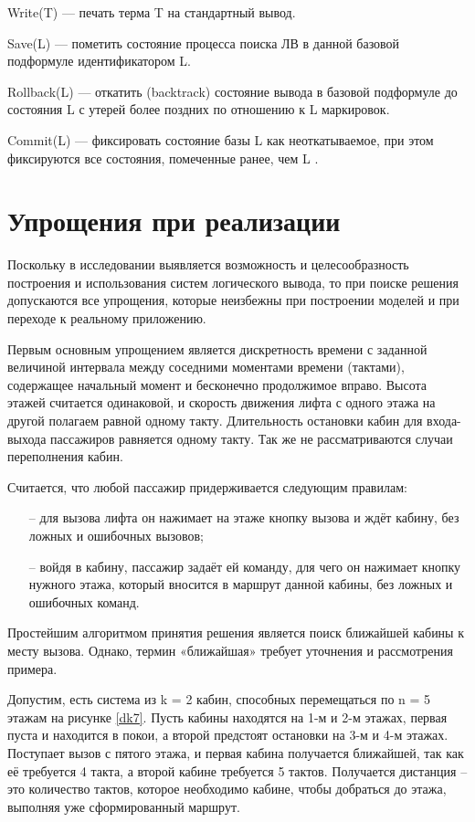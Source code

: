 Write(T) — печать терма T на стандартный вывод.

Save(L) — пометить состояние процесса поиска ЛВ в данной базовой подформуле идентификатором L.

Rollback(L) — откатить (backtrack) состояние вывода в базовой подформуле до состояния L с утерей более поздних по отношению к L маркировок.

Commit(L) — фиксировать состояние базы L как неоткатываемое, при этом фиксируются все состояния, помеченные ранее, чем L .
 
    
\section{Упрощения при реализации}
Поскольку в исследовании выявляется возможность и целесообразность построения и использования систем логического вывода, то при поиске решения допускаются все упрощения, которые неизбежны при построении моделей и при переходе к реальному приложению.

	Первым основным упрощением является дискретность времени с заданной величиной интервала между
		соседними моментами времени (тактами), содержащее начальный момент и бесконечно продолжимое вправо.
		Высота этажей считается одинаковой, и скорость движения лифта с одного этажа на другой полагаем
		равной одному такту. Длительность остановки кабин для входа-выхода пассажиров равняется одному такту.
		Так же не рассматриваются случаи переполнения кабин.

	Считается, что любой пассажир придерживается следующим правилам:
    
    \begin{itemize}
				\item[--] для вызова лифта он нажимает на этаже кнопку вызова и ждёт кабину, без ложных и ошибочных вызовов;
				\item[--] войдя в кабину, пассажир задаёт ей команду, для чего он нажимает кнопку нужного этажа, который вносится в маршрут данной кабины, без ложных и ошибочных команд.
    \end{itemize}

	Простейшим алгоритмом принятия решения является поиск ближайшей кабины к месту вызова.
		Однако, термин «ближайшая» требует уточнения и рассмотрения примера. 

	Допустим, есть система из k = 2 кабин, способных перемещаться по n = 5 этажам на рисунке \ref{dk7}.
		Пусть кабины находятся на 1-м и 2-м этажах, первая пуста и находится в покои,
		а второй предстоят остановки на 3-м и 4-м этажах. Поступает вызов с пятого этажа,
		и первая кабина получается ближайшей, так как её требуется 4 такта,
		а второй кабине требуется 5 тактов. Получается дистанция – это количество тактов,
		которое необходимо кабине, чтобы добраться до этажа, выполняя уже сформированный маршрут.
        
